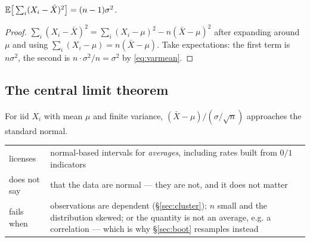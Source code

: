 \begin{lemma}
\label{lem:bessel}
$\mathbb{E}\big[\sum_i (X_i-\bar X)^2\big]=(n-1)\sigma^2$.
\end{lemma}
\begin{proof}
$\sum_i(X_i-\bar X)^2=\sum_i(X_i-\mu)^2-n(\bar X-\mu)^2$ after expanding around
$\mu$ and using $\sum_i(X_i-\mu)=n(\bar X-\mu)$. Take expectations: the first term
is $n\sigma^2$, the second is $n\cdot\sigma^2/n=\sigma^2$ by \cref{eq:varmean}.
\end{proof}


\subsection{The central limit theorem}



\begin{theorem}
\label{thm:clt}
For iid $X_i$ with mean $\mu$ and finite variance,
$(\bar X-\mu)/(\sigma/\sqrt n)$ approaches the standard normal.
\end{theorem}

\begin{table}[H]\centering\small
\begin{tabularx}{\textwidth}{P{2.5cm}Y}
\toprule
licenses & normal-based intervals for \emph{averages}, including rates built from
$0/1$ indicators\\
does not say & that the data are normal --- they are not, and it does not matter\\
fails when & observations are dependent (§\ref{sec:cluster}); $n$ small and the
distribution skewed; or the quantity is not an average, e.g. a correlation --- which
is why §\ref{sec:boot} resamples instead\\
\bottomrule
\end{tabularx}
\end{table}

